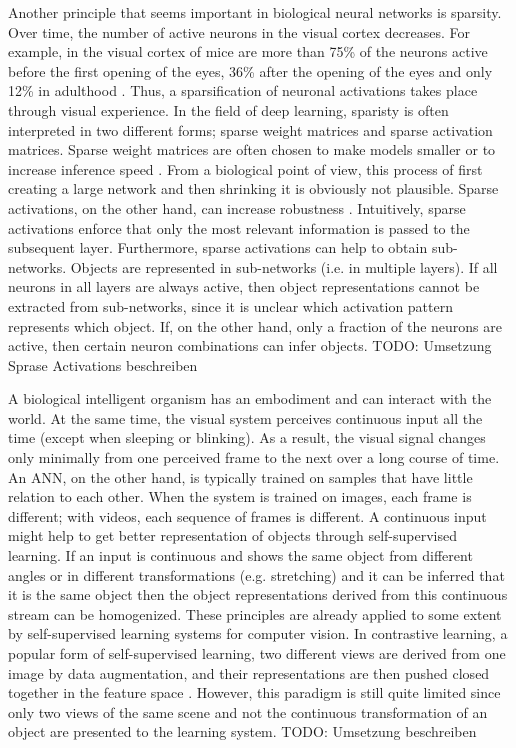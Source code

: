 Another principle that seems important in biological neural networks is sparsity.
Over time, the number of active neurons in the visual cortex decreases.
For example, in the visual cortex of mice are more than 75\% of the neurons active before the first opening of the eyes, 36\% after the opening of the eyes and only 12\% in adulthood .
Thus, a sparsification of neuronal activations takes place through visual experience.
In the field of deep learning, sparisty is often interpreted in two different forms; sparse weight matrices and sparse activation matrices.
Sparse weight matrices are often chosen to make models smaller or to increase inference speed \cite{Louizos_Welling_Kingma_2018, Hoefler_Alistarh_Ben_Nun_Dryden_Peste_2021}.
From a biological point of view, this process of first creating a large network and then shrinking it is obviously not plausible.
Sparse activations, on the other hand, can increase robustness \cite{Panousis_Chatzis_Theodoridis_2021}.
Intuitively, sparse activations enforce that only the most relevant information is passed to the subsequent layer.
Furthermore, sparse activations can help to obtain sub-networks.
Objects are represented in sub-networks (i.e. in multiple layers).
If all neurons in all layers are always active, then object representations cannot be extracted from sub-networks, since it is unclear which activation pattern represents which object.
If, on the other hand, only a fraction of the neurons are active, then certain neuron combinations can infer objects.
TODO: Umsetzung Sprase Activations beschreiben

A biological intelligent organism has an embodiment and can interact with the world.
At the same time, the visual system perceives continuous input all the time (except when sleeping or blinking).
As a result, the visual signal changes only minimally from one perceived frame to the next over a long course of time.
An ANN, on the other hand, is typically trained on samples that have little relation to each other.
When the system is trained on images, each frame is different; with videos, each sequence of frames is different.
A continuous input might help to get better representation of objects through self-supervised learning.
If an input is continuous and shows the same object from different angles or in different transformations (e.g. stretching) and it can be inferred that it is the same object then the object representations derived from this continuous stream can be homogenized.
These principles are already applied to some extent by self-supervised learning systems for computer vision.
In contrastive learning, a popular form of self-supervised learning, two different views are derived from one image by data augmentation, and their representations are then pushed closed together in the feature space .
However, this paradigm is still quite limited since only two views of the same scene and not the continuous transformation of an object are presented to the learning system.
TODO: Umsetzung beschreiben
